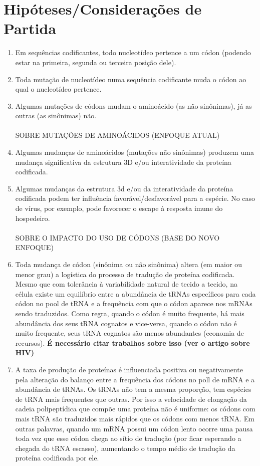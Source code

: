 \documentclass[12pt]{article}
\begin{document}
\section{Hipóteses/Considerações de Partida}
\begin{enumerate}
    \item Em sequências codificantes, todo nucleotídeo pertence a um códon (podendo estar na primeira, segunda ou terceira posição dele).
    \item Toda mutação de nucleotídeo numa sequência codificante muda o códon ao qual o nucleotídeo pertence.
    \item Algumas mutações de códons mudam o aminoácido (as não sinônimas), já as outras (as sinônimas) não.
          \\\\SOBRE MUTAÇÕES DE AMINOÁCIDOS (ENFOQUE ATUAL)\\
    \item Algumas mudanças de aminoácidos (mutações não sinônimas) produzem uma mudança significativa da estrutura 3D e/ou interatividade da proteína codificada.
    \item Algumas mudanças da estrutura 3d e/ou da interatividade da proteína codificada podem ter influência favorável/desfavorável para a espécie. No caso de vírus, por exemplo, pode favorecer o escape à resposta imune do hospedeiro.
          \\\\SOBRE O IMPACTO DO USO DE CÓDONS (BASE DO NOVO ENFOQUE)\\
    \item Toda mudança de códon (sinônima ou não sinônima) altera (em maior ou menor grau) a logística do processo de tradução de proteína codificada. Mesmo que com tolerância à variabilidade natural de tecido a tecido, na célula existe um equilíbrio entre a abundância de tRNAs específicos para cada códon no pool de tRNA e a frequência com que o códon aparece nos mRNAs sendo traduzidos. Como regra, quando o códon é muito frequente, há mais abundância dos seus tRNA cognatos e vice-versa, quando o códon não é muito frequente, seus tRNA cognatos são menos abundantes (economia de recursos). \textbf{É necessário citar trabalhos sobre isso (ver o artigo sobre HIV)}
    \item A taxa de produção de proteínas é influenciada positiva ou negativamente pela alteração do balanço entre a frequência dos códons no poll de mRNA e a abundância de tRNAs. Os tRNAs não tem a mesma proporção, tem espécies de tRNA mais frequentes que outras. Por isso a velocidade de elongação da cadeia polipeptídica que compõe uma proteína não é uniforme: os códons com mais tRNA são traduzidos mais rápidos que os códons com menos tRNA. Em outras palavras, quando um mRNA possui um códon lento ocorre uma pausa toda vez que esse códon chega ao sítio de tradução (por ficar esperando a chegada do tRNA escasso), aumentando o tempo médio de tradução da proteína codificada por ele.

\end{enumerate}
\end{document}
